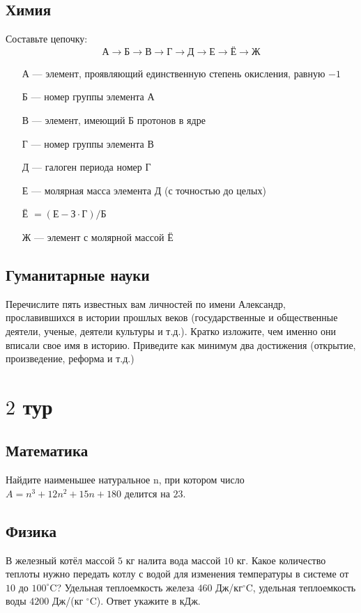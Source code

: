 \documentclass[a4paper, 12pt]{article}
\begin{document}
	 \subsection*{Химия}
	 Составьте цепочку: 
	 \[\text{А}\to\text{Б}\to\text{В}\to\text{Г}\to\text{Д}\to\text{Е}\to\text{Ё}\to\text{Ж}\]
	 \begin{itemize}
	 	\item[А] --- элемент, проявляющий единственную степень окисления, равную $-1$
	 	\item[Б] --- номер группы элемента А
	 	\item[В] ---  элемент, имеющий Б протонов в ядре
	 	\item[Г] --- номер группы элемента В
	 	\item[Д] --- галоген периода номер Г
	 	\item[Е] --- молярная масса элемента Д (с точностью до целых)
	 	\item[Ё]$=(\text{Е} - \text{З}\cdot\text{Г})/\text{Б}$
	 	\item[Ж] --- элемент с молярной массой Ё
	 \end{itemize}
 	 \subsection*{Гуманитарные науки}
 	 Перечислите пять известных вам личностей по имени Александр, прославившихся в истории прошлых веков (государственные и общественные деятели, ученые, деятели культуры и т.д.). Кратко изложите, чем именно они вписали свое имя в историю. Приведите как минимум два достижения (открытие, произведение, реформа и т.д.)
 	 
	 \newpage
	 \clearpage
	 \pagestyle{empty}
	 \section*{$2$ тур}
	 \subsection*{Математика}
	 Найдите наименьшее натуральное n, при котором число $A = n^3 + 12n^2 + 15n + 180$ делится на $23$.
	 \subsection*{Физика}
	 В железный котёл массой $5$ кг налита вода массой $10$ кг. Какое количество теплоты нужно передать котлу с водой для изменения температуры в системе от $10$ до $100^\circ$C? Удельная теплоемкость железа $460$ Дж/кг$^\circ$C, удельная теплоемкость воды $4200$ Дж/(кг $^\circ$C). Ответ укажите в кДж.
\end{document}
